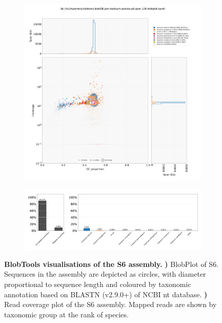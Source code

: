 \begin{figure}[hp!]
    \centering
    \begin{subfigure}[]{0.99\textwidth}
        \centering
        \includegraphics[width=\textwidth]{Appendices/S6_Foc1Assembly.blobtools.blobDB.json.bestsum.species.p8.span.100.blobplot.bam0.png}
        \caption{}
        \label{fig:BlobPlot-S6}
    \end{subfigure}
    \begin{subfigure}[]{0.9\textwidth}
        \centering
        \includegraphics[width=\textwidth]{Appendices/S6_Foc1Assembly.blobtools.blobDB.json.bestsum.species.p8.span.100.blobplot.read_cov.bam0.png}
        \caption{}
        \label{fig:BlobPlot_readcov-S6}
    \end{subfigure}
    \caption[BlobTools visualisations of the S6 assembly]{\textbf{BlobTools visualisations of the S6 assembly.}
        \textbf{) }BlobPlot of S6. Sequences in the assembly are depicted as circles, with diameter proportional to sequence length and coloured by taxonomic annotation based on BLASTN (v2.9.0+) of NCBI nt database.
        \textbf{)} Read coverage plot of the S6 assembly. Mapped reads are shown by taxonomic group at the rank of species.}
        \label{fig:S6:BlobTools}
\end{figure}



